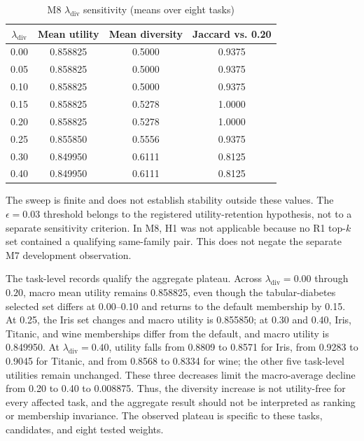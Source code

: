 \documentclass[conference]{IEEEtran}
\begin{document}
\begin{table}[t]
\caption{M8 $\lambda_{\mathrm{div}}$ sensitivity (means over eight tasks)}
\label{tab:lambda}
\centering
\footnotesize
\begin{tabular}{cccc}
\toprule
$\lambda_{\mathrm{div}}$ & Mean utility & Mean diversity & Jaccard vs. 0.20\\
\midrule
0.00 & 0.858825 & 0.5000 & 0.9375\\
0.05 & 0.858825 & 0.5000 & 0.9375\\
0.10 & 0.858825 & 0.5000 & 0.9375\\
0.15 & 0.858825 & 0.5278 & 1.0000\\
0.20 & 0.858825 & 0.5278 & 1.0000\\
0.25 & 0.855850 & 0.5556 & 0.9375\\
0.30 & 0.849950 & 0.6111 & 0.8125\\
0.40 & 0.849950 & 0.6111 & 0.8125\\
\bottomrule
\end{tabular}
\end{table}

The sweep is finite and does not establish stability outside these values. The $\epsilon=0.03$ threshold belongs to the registered utility-retention hypothesis, not to a separate sensitivity criterion. In M8, H1 was not applicable because no R1 top-$k$ set contained a qualifying same-family pair. This does not negate the separate M7 development observation.

The task-level records qualify the aggregate plateau. Across $\lambda_{\mathrm{div}}=0.00$ through $0.20$, macro mean utility remains 0.858825, even though the tabular-diabetes selected set differs at 0.00--0.10 and returns to the default membership by 0.15. At 0.25, the Iris set changes and macro utility is 0.855850; at 0.30 and 0.40, Iris, Titanic, and wine memberships differ from the default, and macro utility is 0.849950. At $\lambda_{\mathrm{div}}=0.40$, utility falls from 0.8809 to 0.8571 for Iris, from 0.9283 to 0.9045 for Titanic, and from 0.8568 to 0.8334 for wine; the other five task-level utilities remain unchanged. These three decreases limit the macro-average decline from 0.20 to 0.40 to 0.008875. Thus, the diversity increase is not utility-free for every affected task, and the aggregate result should not be interpreted as ranking or membership invariance. The observed plateau is specific to these tasks, candidates, and eight tested weights.
\end{document}
